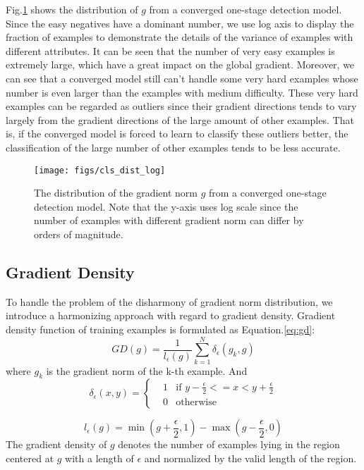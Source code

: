 \documentclass[letterpaper]{article} \usepackage{aaai19}  \usepackage{times}  \usepackage{helvet}  \usepackage{courier}  \usepackage{url}  \usepackage{graphicx}  \usepackage{amsmath,amssymb}
\begin{document}
Fig.\ref{fig:cls_dist_log} shows the distribution of $g$ from a converged one-stage detection model. Since the easy negatives have a dominant number, we use log axis to display the fraction of examples to demonstrate the details of the variance of examples with different attributes. It can be seen that the number of very easy examples is extremely large, which have a great impact on the global gradient. Moreover, we can see that a converged model still can't handle some very hard examples whose number is even larger than the examples with medium difficulty. These very hard examples can be regarded as outliers since their gradient directions tends to vary largely from the gradient directions of the large amount of other examples. That is, if the converged model is forced to learn to classify these outliers better, the classification of the large number of other examples tends to be less accurate.
\begin{figure}[ht]
\centering
\texttt{[image: figs/cls\_dist\_log]}
\caption{The distribution of the gradient norm $g$ from a converged one-stage detection model. Note that the y-axis uses log scale since the number of examples with different gradient norm can differ by orders of magnitude.}
\label{fig:cls_dist_log}
\end{figure}

\subsection{Gradient Density}

To handle the problem of the disharmony of gradient norm distribution, we introduce a harmonizing approach with regard to gradient density. Gradient density function of training examples is formulated as Equation.\ref{eq:gd}:
\begin{equation}
\label{eq:gd}
  GD(g) = \frac{1}{l_\epsilon(g)}\sum_{k=1}^N\delta_\epsilon(g_k, g)
\end{equation}
where $g_k$ is the gradient norm of the k-th example. And
\begin{equation}
  \delta_\epsilon(x, y) = \left\{
    \begin{aligned}
    & 1  & \text{if } y-\frac{\epsilon}{2} <= x < y+\frac{\epsilon}{2} \\
    & 0  & \text{otherwise}
    \end{aligned}
    \right.
\end{equation}

\begin{equation}
l_\epsilon(g) = \min(g+\frac{\epsilon}{2}, 1) - \max(g-\frac{\epsilon}{2}, 0)
\end{equation}
The gradient density of $g$ denotes the number of examples lying in the region centered at $g$ with a length of $\epsilon$ and normalized by the valid length of the region. 
\end{document}
